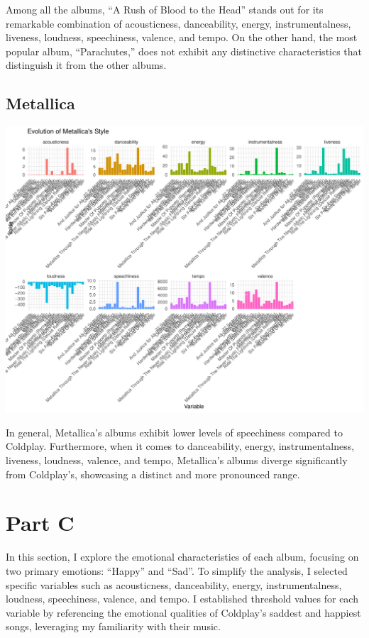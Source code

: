 \documentclass[11pt,preprint, authoryear]{elsarticle}
\numberwithin{equation}{section}
\numberwithin{figure}{section}
\numberwithin{table}{section}
\begin{document}
Among all the albums, ``A Rush of Blood to the Head'' stands out for its
remarkable combination of acousticness, danceability, energy,
instrumentalness, liveness, loudness, speechiness, valence, and tempo.
On the other hand, the most popular album, ``Parachutes,'' does not
exhibit any distinctive characteristics that distinguish it from the
other albums.

\hypertarget{metallica-1}{%
\subsection{Metallica}\label{metallica-1}}

\includegraphics[angle=90]{Question3_files/figure-latex/unnamed-chunk-4-1}

In general, Metallica's albums exhibit lower levels of speechiness
compared to Coldplay. Furthermore, when it comes to danceability,
energy, instrumentalness, liveness, loudness, valence, and tempo,
Metallica's albums diverge significantly from Coldplay's, showcasing a
distinct and more pronounced range.

\hypertarget{part-c}{%
\section{Part C}\label{part-c}}

In this section, I explore the emotional characteristics of each album,
focusing on two primary emotions: ``Happy'' and ``Sad''. To simplify the
analysis, I selected specific variables such as acousticness,
danceability, energy, instrumentalness, loudness, speechiness, valence,
and tempo. I established threshold values for each variable by
referencing the emotional qualities of Coldplay's saddest and happiest
songs, leveraging my familiarity with their music.
\end{document}
